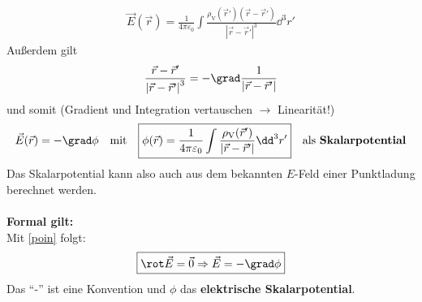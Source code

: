			        \begin{equation}\label{CoulInt}\begin{split}
					        \boxed{\vec{E} (\vec{r} )= \frac{1}{4\pi\varepsilon_0}
					        \int
					        \frac{\rho_\text{V}(\vec{r}' )\left(\vec{r} -\vec{r}' \right)}{\left|\vec{r} -\vec{r}' \right|^3
					        } \dd^3r'}
				        \end{split}\end{equation}
			   Außerdem gilt
			        \begin{equation}\begin{split}
					        \frac{\vec{r} -\vec{r}' }{\left|\vec{r} -\vec{r}' \right|^3}
					        = -\grad  \frac{1}{\left|\vec{r} -\vec{r}' \right|}
				        \end{split}\end{equation}
			   und somit (Gradient und Integration vertauschen $\rightarrow$ Linearität!)
			        \begin{equation}\label{PotR}\begin{split}
					        \vec{E}(\vec{r} ) = -\grad \phi \quad\text{mit}\quad
					        \boxed{\phi(\vec{r} ) = \frac{1}{4\pi\varepsilon_0}
						        \int
						        \frac{\rho_\text{V}(\vec{r}' )}{\left|\vec{r} -\vec{r}' \right|} \dd^3r'} \quad\text{als }\textbf{{Skalarpotential}}
				        \end{split}\end{equation}
			        Das Skalarpotential kann also auch aus dem bekannten $E$-Feld einer Punktladung berechnet werden.\\\\
\textbf{Formal gilt:}\\ 
	  Mit \ref{poin} folgt: \begin{equation}\boxed{\rot \vec{E} = \vec{0} \Rightarrow \vec{E}
			  = -\grad \phi}\end{equation}
		  Das \enquote{-} ist eine Konvention und $\phi$ das
	  \textbf{elektrische Skalarpotential}.
